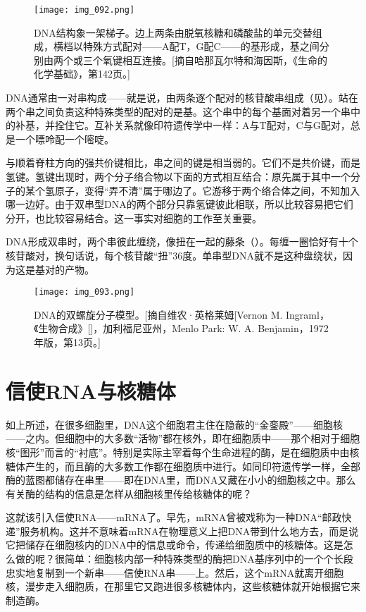 \begin{figure}
\texttt{[image: img\_092.png]}
\caption[DNA的梯状结构。]
  {DNA结构象一架梯子。边上两条由脱氧核糖和磷酸盐的单元交替组成，横档以特殊方式配对——A配T，G配C——的基形成，基之间分别由两个或三个氧键相互连接。[摘自哈那瓦尔特和海因斯，《生命的化学基础》，第142页。]}
\end{figure}

DNA通常由一对串构成——就是说，由两条逐个配对的核苷酸串组成（见）。站在两个串之间负责这种特殊类型的配对的是基。这个串中的每个基面对着另一个串中的补基，并拴住它。互补关系就像印符遗传学中一样：A与T配对，C与G配对，总是一个嘌呤配一个嘧啶。

与顺着脊柱方向的强共价键相比，串之间的键是相当弱的。它们不是共价键，而是氢键。氢键出现时，两个分子络合物以下面的方式相互结合：原先属于其中一个分子的某个氢原子，变得“弄不清”属于哪边了。它游移于两个络合体之间，不知加入哪一边好。由于双串型DNA的两个部分只靠氢键彼此相联，所以比较容易把它们分开，也比较容易结合。这一事实对细胞的工作至关重要。

DNA形成双串时，两个串彼此缠绕，像扭在一起的藤条（）。每缠一圈恰好有十个核苷酸对，换句话说，每个核苷酸“扭”$36$度。单串型DNA就不是这种盘绕状，因为这是基对的产物。

\begin{figure}
\texttt{[image: img\_093.png]}
\caption[DNA的双螺旋分子模型。]
  {DNA的双螺旋分子模型。[摘自维农·英格莱姆[Vernon M. Ingraml，《生物合成》[]，加利福尼亚州，Menlo Park: W. A. Benjamin，1972年版，第13页。]}
\end{figure}

\section{信使RNA与核糖体}

如上所述，在很多细胞里，DNA这个细胞君主住在隐蔽的“金銮殿”——细胞核——之内。但细胞中的大多数“活物”都在核外，即在细胞质中——那个相对于细胞核“图形”而言的“衬底”。特别是实际主宰着每个生命进程的酶，是在细胞质中由核糖体产生的，而且酶的大多数工作都在细胞质中进行。如同印符遗传学一样，全部酶的蓝图都储存在串里——即在DNA里，而DNA又藏在小小的细胞核之中。那么有关酶的结构的信息是怎样从细胞核里传给核糖体的呢？

这就该引入信使RNA——mRNA了。早先，mRNA曾被戏称为一种DNA“邮政快递”服务机构。这并不意味着mRNA在物理意义上把DNA带到什么地方去，而是说它把储存在细胞核内的DNA中的信息或命令，传递给细胞质中的核糖体。这是怎么做的呢？很简单：细胞核内部一种特殊类型的酶把DNA基序列中的一个个长段忠实地复制到一个新串——信使RNA串——上。然后，这个mRNA就离开细胞核，漫步走入细胞质，在那里它又跑进很多核糖体内，这些核糖体就开始根据它来制造酶。

